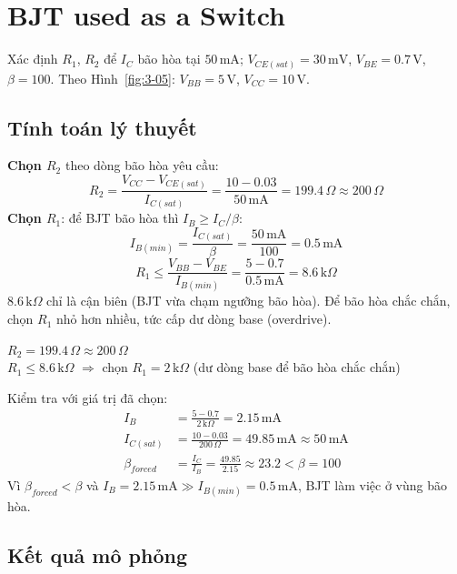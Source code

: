 \section{BJT used as a Switch}
Xác định $R_1$, $R_2$ để $I_C$ bão hòa tại $50\,\text{mA}$; $V_{CE(sat)} = 30\,\text{mV}$, $V_{BE} = 0.7\,\text{V}$, $\beta = 100$. Theo Hình~\ref{fig:3-05}: $V_{BB} = 5\,\text{V}$, $V_{CC} = 10\,\text{V}$.


\subsection{Tính toán lý thuyết}
\textbf{Chọn $R_2$} theo dòng bão hòa yêu cầu:
\[ R_2 = \frac{V_{CC} - V_{CE(sat)}}{I_{C(sat)}} = \frac{10 - 0.03}{50\,\text{mA}} = 199.4\,\Omega \approx 200\,\Omega \]
\textbf{Chọn $R_1$}: để BJT bão hòa thì $I_B \ge I_C/\beta$:
\[ I_{B(min)} = \frac{I_{C(sat)}}{\beta} = \frac{50\,\text{mA}}{100} = 0.5\,\text{mA} \]
\[ R_1 \le \frac{V_{BB} - V_{BE}}{I_{B(min)}} = \frac{5 - 0.7}{0.5\,\text{mA}} = 8.6\,\text{k}\Omega \]
$8.6\,\text{k}\Omega$ chỉ là cận biên (BJT vừa chạm ngưỡng bão hòa). Để bão hòa chắc chắn, chọn $R_1$ nhỏ hơn nhiều, tức cấp dư dòng base (overdrive).

\begin{dapsobox}
$R_2 = 199.4\,\Omega \approx 200\,\Omega$ \\[2pt]
$R_1 \le 8.6\,\text{k}\Omega$ \quad $\Rightarrow$ chọn $R_1 = 2\,\text{k}\Omega$ (dư dòng base để bão hòa chắc chắn)
\end{dapsobox}

Kiểm tra với giá trị đã chọn:
\begin{align*}
I_B &= \frac{5 - 0.7}{2\,\text{k}\Omega} = 2.15\,\text{mA}\\
I_{C(sat)} &= \frac{10 - 0.03}{200\,\Omega} = 49.85\,\text{mA} \approx 50\,\text{mA}\\
\beta_{forced} &= \frac{I_C}{I_B} = \frac{49.85}{2.15} \approx 23.2 < \beta = 100
\end{align*}
Vì $\beta_{forced} < \beta$ và $I_B = 2.15\,\text{mA} \gg I_{B(min)} = 0.5\,\text{mA}$, BJT làm việc ở vùng bão hòa.

\subsection{Kết quả mô phỏng}

